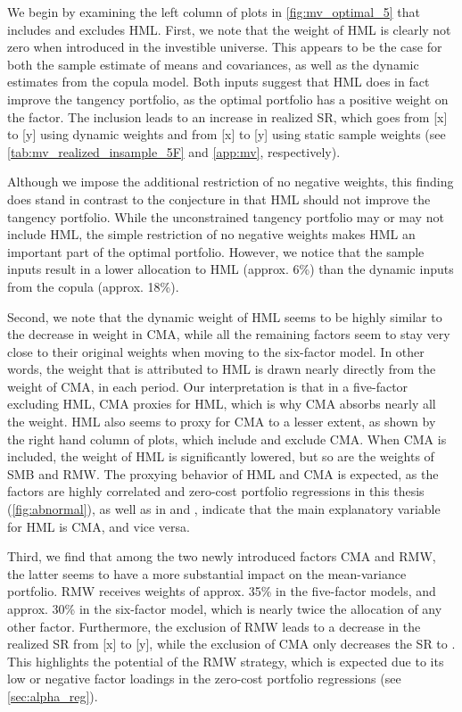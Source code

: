 We begin by examining the left column of plots in \autoref{fig:mv_optimal_5} that includes and excludes HML. First, we note that the weight of HML is clearly not zero when introduced in the investible universe. This appears to be the case for both the sample estimate of means and covariances, as well as the dynamic estimates from the copula model. Both inputs suggest that HML does in fact improve the tangency portfolio, as the optimal portfolio has a positive weight on the factor. The inclusion leads to an increase in realized SR, which goes from [x] to [y] using dynamic weights and from [x] to [y] using static sample weights (see \autoref{tab:mv_realized_insample_5F} and \autoref{app:mv}, respectively).

Although we impose the additional restriction of no negative weights, this finding does stand in contrast to the conjecture in \textcite{FF2015} that HML should not improve the tangency portfolio. While the unconstrained tangency portfolio may or may not include HML, the simple restriction of no negative weights makes HML an important part of the optimal portfolio. However, we notice that the sample inputs result in a lower allocation to HML (approx. 6\%) than the dynamic inputs from the copula (approx. 18\%).

Second, we note that the dynamic weight of HML seems to be highly similar to the decrease in weight in CMA, while all the remaining factors seem to stay very close to their original weights when moving to the six-factor model. In other words, the weight that is attributed to HML is drawn nearly directly from the weight of CMA, in each period. Our interpretation is that in a five-factor excluding HML, CMA proxies for HML, which is why CMA absorbs nearly all the weight. HML also seems to proxy for CMA to a lesser extent, as shown by the right hand column of plots, which include and exclude CMA. When CMA is included, the weight of HML is significantly lowered, but so are the weights of SMB and RMW. The proxying behavior of HML and CMA is expected, as the factors are highly correlated and zero-cost portfolio regressions in this thesis (\autoref{fig:abnormal}), as well as in \textcite{FF2015} and \textcite{Asness2015}, indicate that the main explanatory variable for HML is CMA, and vice versa.

Third, we find that among the two newly introduced factors CMA and RMW, the latter seems to have a more substantial impact on the mean-variance portfolio. RMW receives weights of approx. 35\% in the five-factor models, and approx. 30\% in the six-factor model, which is nearly twice the allocation of any other factor. Furthermore, the exclusion of RMW leads to a decrease in the realized SR from [x] to [y], while the exclusion of CMA only decreases the SR to  . This highlights the potential of the RMW strategy, which is expected due to its low or negative factor loadings in the zero-cost portfolio regressions (see \autoref{sec:alpha_reg}).

